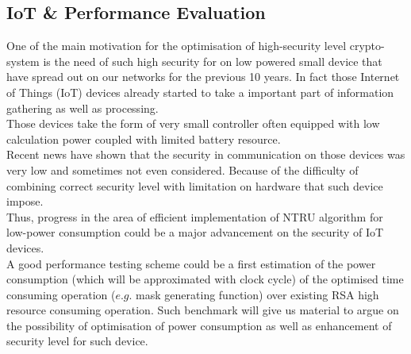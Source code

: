 \subsection{IoT \& Performance Evaluation}
One of the main motivation for the optimisation of high-security level crypto-system is the need of such high security for on low powered small device that have spread out on our networks for the previous 10 years. In fact those Internet of Things (IoT) devices already started to take a important part of information gathering as well as processing.\\
Those devices take the form of very small controller often equipped with low calculation power coupled with limited battery resource.\\
Recent news have shown that the security in communication on those devices was very low and sometimes not even considered. Because of the difficulty of combining correct security level with limitation on hardware that such device impose.\\
Thus, progress in the area of efficient implementation of NTRU algorithm for low-power consumption could be a major advancement on the security of IoT devices.
\\A good performance testing scheme could be a first estimation of the power consumption (which will be approximated with clock cycle) of the optimised time consuming operation ($e.g.$ mask generating function) over existing RSA high resource consuming operation. Such benchmark will give us material to argue on the possibility of optimisation of power consumption as well as  enhancement of security level for such device.

